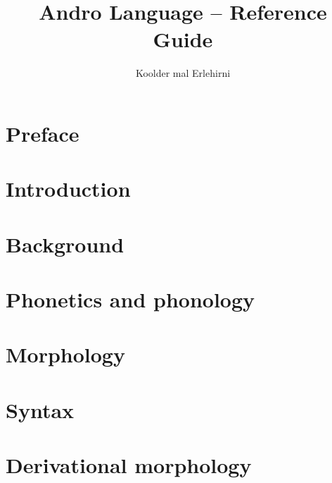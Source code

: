 \documentclass[b5paper,justified,nobib,nofonts]{tufte-book}
\title{Andro Language -- Reference Guide}
\author{Koolder mal Erlehirni}
\newcommand{\blankpage}{\newpage\hbox{}\thispagestyle{empty}\newpage}
\begin{document}
\frontmatter


\blankpage

\newpage\thispagestyle{empty}


\maketitle

\newpage


\tableofcontents

% 

\cleardoublepage
\chapter*{Preface}


\mainmatter

\chapter{Introduction}
\label{ch:introduction}


\chapter{Background}
\label{ch:background}


\chapter{Phonetics and phonology}
\label{ch:phonetics}


\chapter{Morphology}
\label{ch:morphology}


\chapter{Syntax}
\label{ch:syntax}


\chapter{Derivational morphology}
\label{ch:derivational}

\end{document}
